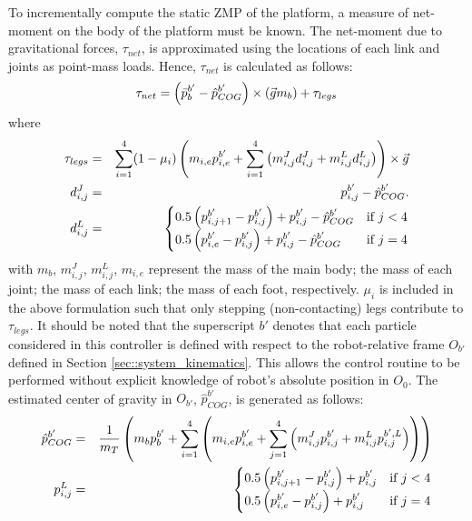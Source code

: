 		To incrementally compute the static ZMP of the platform, a measure of net-moment on the body of the platform must be known. The net-moment due to gravitational forces, $\tau_{net}$, is approximated using the locations of each link and joints as point-mass loads. Hence, $\tau_{net}$ is calculated as follows:
			\begin{equation}
				\tau_{net} 	=  \left(\bar{p}_{b}^{b'}-\hat{p}_{COG}^{b'} \right) \times \left(\vec{g} m_{b}\right)	+ \tau_{legs}
				\label{eq::net_moment}
			\end{equation}
		where
			\begin{eqnarray*}
					\tau_{legs}		& = & \sum_{i=1}^{4} (1-\mu_{i}) \left( m_{i,e} p_{i,e}^{b'} + \sum_{i=1}^{4}   \left( m_{i,j}^{J} d_{i,j}^{J} + m_{i,j}^{L} d_{i,j}^{L} \right) \right) \times \vec{g} \nonumber \\
					d_{i,j}^{J} 	& = & {{p}_{i,j}^{b'}-\hat{p}_{COG}^{b'}.} \nonumber \\														
					d_{i,j}^{L} 	& = &
					\begin{cases}
					{ 0.5  \left({p}_{i,j+1}^{b'}-{p}_{i,j}^{b'}\right) + {p}_{i,j}^{b'} - \hat{p}_{COG}^{b'}} 	&\text{if } j < 4 \\
					{ 0.5  \left({p}_{i,e}^{b'}-{p}_{i,j}^{b'}\right) + {p}_{i,j}^{b'} - \hat{p}_{COG}^{b'}} 		&\text{if } j = 4
					\end{cases} \nonumber
				\label{eq::Levers}
			\end{eqnarray*}
		with $m_{b}$, $m_{i,j}^{J}$, $m_{i,j}^{L}$, $m_{i,e}$ represent the mass of the main body; the mass of each joint; the mass of each link; the mass of each foot, respectively. $\mu_{i}$ is included in the above formulation such that only stepping (non-contacting) legs contribute to  $\tau_{legs}$. It should be noted that the superscript ${b'}$ denotes that each particle considered in this controller is defined with respect to the robot-relative frame $O_{b'}$ defined in Section \ref{sec::system_kinematics}. This allows the control routine to be performed without explicit knowledge of robot's absolute position in $O_{0}$. The estimated center of gravity in $O_{b'}$, $\hat{p}_{COG}^{b'}$, is generated as follows:
			\begin{eqnarray}
				\hat{p}_{COG}^{b'} 	& = & \frac{1}{m_{T}}\left( m_{b}p_{b}^{b'} + \sum_{i=1}^{4} \left(m_{i,e}{p}_{i,e}^{b'} + \sum_{j=1}^{4} \left(  m_{i,j}^{J}{p}_{i,j}^{b'} +  m_{i,j}^{L}{p}_{i,j}^{b',L} \right) \right)\right) 	\nonumber \\
				{p}_{i,j}^{L} 	& = & 
					\begin{cases}
					{ 0.5  \left({p}_{i,j+1}^{b'}-{p}_{i,j}^{b'}\right) + {p}_{i,j}^{b'} } 	&\text{if } j < 4 \\
					{ 0.5  \left({p}_{i,e}^{b'}-{p}_{i,j}^{b'}\right) + {p}_{i,j}^{b'} } 		&\text{if } j = 4
					\end{cases}
				\label{eq::cog_estimate}
			\end{eqnarray}
